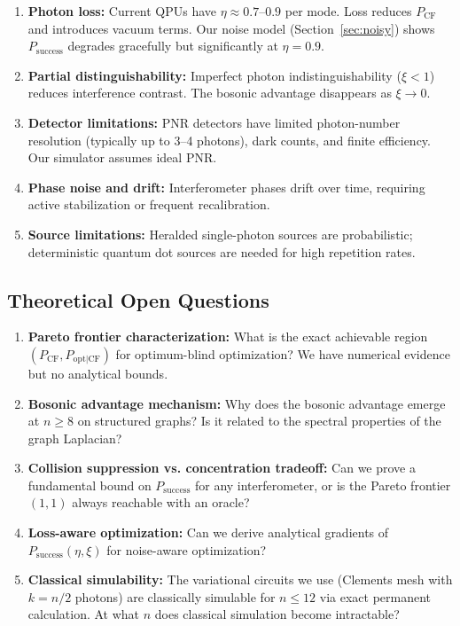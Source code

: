 \begin{enumerate}
\item \textbf{Photon loss:} Current QPUs have $\eta \approx 0.7$--$0.9$ per mode. Loss reduces $P_{\mathrm{CF}}$ and introduces vacuum terms. Our noise model (Section~\ref{sec:noisy}) shows $P_{\mathrm{success}}$ degrades gracefully but significantly at $\eta=0.9$.
\item \textbf{Partial distinguishability:} Imperfect photon indistinguishability ($\xi < 1$) reduces interference contrast. The bosonic advantage disappears as $\xi \to 0$.
\item \textbf{Detector limitations:} PNR detectors have limited photon-number resolution (typically up to 3--4 photons), dark counts, and finite efficiency. Our simulator assumes ideal PNR.
\item \textbf{Phase noise and drift:} Interferometer phases drift over time, requiring active stabilization or frequent recalibration.
\item \textbf{Source limitations:} Heralded single-photon sources are probabilistic; deterministic quantum dot sources are needed for high repetition rates.
\end{enumerate}

\subsection{Theoretical Open Questions}

\begin{enumerate}
\item \textbf{Pareto frontier characterization:} What is the exact achievable region $(P_{\mathrm{CF}}, P_{\mathrm{opt|CF}})$ for optimum-blind optimization? We have numerical evidence but no analytical bounds.
\item \textbf{Bosonic advantage mechanism:} Why does the bosonic advantage emerge at $n\ge 8$ on structured graphs? Is it related to the spectral properties of the graph Laplacian?
\item \textbf{Collision suppression vs. concentration tradeoff:} Can we prove a fundamental bound on $P_{\mathrm{success}}$ for any interferometer, or is the Pareto frontier $(1,1)$ always reachable with an oracle?
\item \textbf{Loss-aware optimization:} Can we derive analytical gradients of $P_{\mathrm{success}}(\eta,\xi)$ for noise-aware optimization?
\item \textbf{Classical simulability:} The variational circuits we use (Clements mesh with $k=n/2$ photons) are classically simulable for $n \le 12$ via exact permanent calculation. At what $n$ does classical simulation become intractable?
\end{enumerate}

